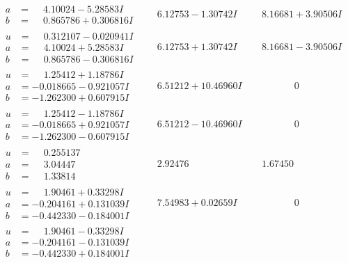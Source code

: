 \documentclass[1p]{elsarticle_modified}
\theoremstyle{definition}
\begin{document}
$$\begin{array}{c|c|c}
\begin{aligned}
a &= \phantom{-}4.10024 - 5.28583 I \\
b &= \phantom{-}0.865786 + 0.306816 I\end{aligned}
 & \phantom{-}6.12753 - 1.30742 I & \phantom{-}8.16681 + 3.90506 I \\ \hline\begin{aligned}
u &= \phantom{-}0.312107 - 0.020941 I \\
a &= \phantom{-}4.10024 + 5.28583 I \\
b &= \phantom{-}0.865786 - 0.306816 I\end{aligned}
 & \phantom{-}6.12753 + 1.30742 I & \phantom{-}8.16681 - 3.90506 I \\ \hline\begin{aligned}
u &= \phantom{-}1.25412 + 1.18786 I \\
a &= -0.018665 - 0.921057 I \\
b &= -1.262300 + 0.607915 I\end{aligned}
 & \phantom{-}6.51212 + 10.46960 I & \phantom{-0.000000 } 0 \\ \hline\begin{aligned}
u &= \phantom{-}1.25412 - 1.18786 I \\
a &= -0.018665 + 0.921057 I \\
b &= -1.262300 - 0.607915 I\end{aligned}
 & \phantom{-}6.51212 - 10.46960 I & \phantom{-0.000000 } 0 \\ \hline\begin{aligned}
u &= \phantom{-}0.255137\phantom{ +0.000000I} \\
a &= \phantom{-}3.04447\phantom{ +0.000000I} \\
b &= \phantom{-}1.33814\phantom{ +0.000000I}\end{aligned}
 & \phantom{-}2.92476\phantom{ +0.000000I} & \phantom{-}1.67450\phantom{ +0.000000I} \\ \hline\begin{aligned}
u &= \phantom{-}1.90461 + 0.33298 I \\
a &= -0.204161 + 0.131039 I \\
b &= -0.442330 - 0.184001 I\end{aligned}
 & \phantom{-}7.54983 + 0.02659 I & \phantom{-0.000000 } 0 \\ \hline\begin{aligned}
u &= \phantom{-}1.90461 - 0.33298 I \\
a &= -0.204161 - 0.131039 I \\
b &= -0.442330 + 0.184001 I\end{aligned}

\end{array}$$
\end{document}
